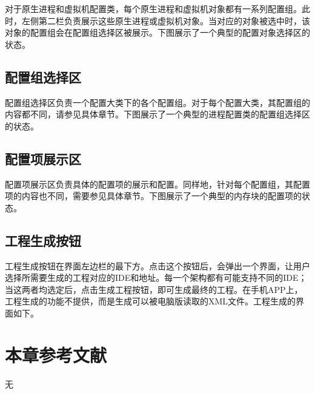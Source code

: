 对于原生进程和虚拟机配置类，每个原生进程和虚拟机对象都有一系列配置组。此时，左侧第二栏负责展示这些原生进程或虚拟机对象。当对应的对象被选中时，该对象的配置组会在配置组选择区被展示。下图展示了一个典型的配置对象选择区的状态。

\subsection{配置组选择区}\label{subsec:5-7-4}

配置组选择区负责一个配置大类下的各个配置组。对于每个配置大类，其配置组的内容都不同，请参见具体章节。下图展示了一个典型的进程配置类的配置组选择区的状态。

\subsection{配置项展示区}\label{subsec:5-7-5}

配置项展示区负责具体的配置项的展示和配置。同样地，针对每个配置组，其配置项的内容也不同，需要参见具体章节。下图展示了一个典型的内存块的配置项的状态。

\subsection{工程生成按钮}\label{subsec:5-7-6}

工程生成按钮在界面左边栏的最下方。点击这个按钮后，会弹出一个界面，让用户选择所需要生成的工程对应的IDE和地址。每一个架构都有可能支持不同的IDE；当这两者均选定后，点击生成工程按钮，即可生成最终的工程。在手机APP上，工程生成的功能不提供，而是生成可以被电脑版读取的XML文件。工程生成的界面如下。


\section{本章参考文献}\label{sec:5-8}

无

